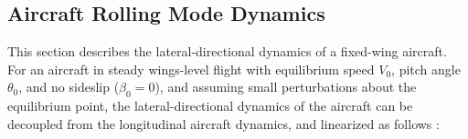 \subsection{Aircraft Rolling Mode Dynamics} \label{subsec:latdir_model}
This section describes the lateral-directional dynamics of a fixed-wing aircraft. For an aircraft in steady wings-level flight with equilibrium speed $V_0$, pitch angle $\theta_0$, and no sideslip ($\beta_0 = 0$), and assuming small perturbations about the equilibrium point, the lateral-directional dynamics of the aircraft can be decoupled from the longitudinal aircraft dynamics, and linearized as follows \cite{stevens2015aircraft}:
